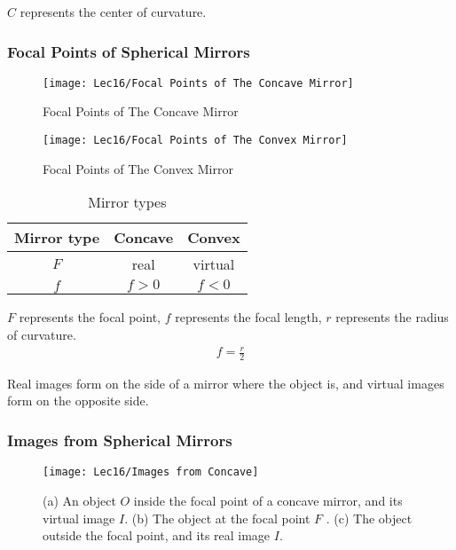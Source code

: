 $C$ represents the center of curvature. 

\subsubsection{Focal Points of Spherical Mirrors}

\begin{figure}[H]
    \centering
    \begin{minipage}{0.22\textwidth}
        \centering
        \texttt{[image: Lec16/Focal Points of The Concave Mirror]}
        \caption{Focal Points of The Concave Mirror}
    \end{minipage}
    \begin{minipage}{0.22\textwidth}
        \centering
        \texttt{[image: Lec16/Focal Points of The Convex Mirror]}
        \caption{Focal Points of The Convex Mirror}
    \end{minipage}
\end{figure}

\begin{table}[H]
    \centering
    \begin{tabular}[c]{|c|c|c|}\hline
        Mirror type & Concave & Convex\\ \hline
        $F$ & real & virtual \\ 
        $f$ & $f>0$ & $f<0$\\ \hline
    \end{tabular}
    \caption{Mirror types}
\end{table}


$F$ represents the focal point, $f$ represents the focal length, $r$ represents the radius of curvature. 
\begin{align*}
    f=\frac{r }{2}
\end{align*}

Real images form on the side of a mirror where the object is, and virtual images form on the opposite side.

\subsubsection{Images from Spherical Mirrors}

\begin{figure}[H]
    \centering
    \texttt{[image: Lec16/Images from Concave]}
    \caption{(a) An object $O$ inside the focal point of a concave mirror, and its virtual image $I$. (b) The object at the focal point $F$ . (c) The object outside the focal point, and its real image $I$.}
\end{figure}

